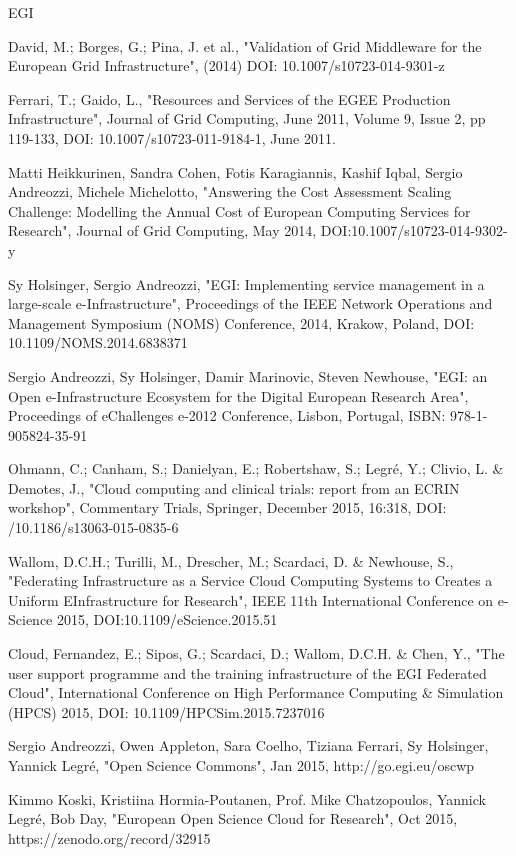 \begin{sitedescription}{EGI}
\begin{compactenum}
\item David, M.; Borges, G.; Pina, J. et al., "Validation of Grid Middleware for the European Grid Infrastructure", (2014) DOI: 10.1007/s10723-014-9301-z 
\item Ferrari, T.; Gaido, L., "Resources and Services of the EGEE Production Infrastructure", Journal of Grid Computing, June 2011, Volume 9, Issue 2, pp 119-133, DOI: 10.1007/s10723-011-9184-1, June 2011. 
\item Matti Heikkurinen, Sandra Cohen, Fotis Karagiannis, Kashif Iqbal, Sergio Andreozzi, Michele Michelotto, "Answering the Cost Assessment Scaling Challenge: Modelling the Annual Cost of European Computing Services for Research", Journal of Grid Computing, May 2014, DOI:10.1007/s10723-014-9302-y 
\item Sy Holsinger, Sergio Andreozzi, "EGI: Implementing service management in a large-scale e-Infrastructure", Proceedings of the IEEE Network Operations and Management Symposium (NOMS) Conference, 2014, Krakow, Poland, DOI: 10.1109/NOMS.2014.6838371
\item Sergio Andreozzi, Sy Holsinger, Damir Marinovic, Steven Newhouse, "EGI: an Open e-Infrastructure Ecosystem for the Digital European Research Area", Proceedings of eChallenges e-2012 Conference, Lisbon, Portugal, ISBN: 978-1-905824-35-91 
\item Ohmann, C.; Canham, S.; Danielyan, E.; Robertshaw, S.; Legr\'e, Y.; Clivio, L. \& Demotes, J., "Cloud computing and clinical trials: report from an ECRIN workshop", Commentary Trials, Springer, December 2015, 16:318, DOI: /10.1186/s13063-015-0835-6 \newline
\item Wallom, D.C.H.; Turilli, M., Drescher, M.; Scardaci, D. \& Newhouse, S., "Federating Infrastructure as a Service Cloud Computing Systems to Creates a Uniform EInfrastructure for Research", IEEE 11th International Conference on e-Science 2015, DOI:10.1109/eScience.2015.51
\item Cloud, Fernandez, E.; Sipos, G.; Scardaci, D.; Wallom, D.C.H. \& Chen, Y., "The user support programme and the training infrastructure of the EGI Federated Cloud", International Conference on High Performance Computing \& Simulation (HPCS) 2015, DOI: 10.1109/HPCSim.2015.7237016 
\item Sergio Andreozzi, Owen Appleton, Sara Coelho, Tiziana Ferrari, Sy Holsinger, Yannick Legr\'e, "Open Science Commons", Jan 2015, http://go.egi.eu/oscwp
\item Kimmo Koski, Kristiina Hormia-Poutanen, Prof. Mike Chatzopoulos, Yannick Legré, Bob Day, "European Open Science Cloud for Research", Oct 2015, https://zenodo.org/record/32915
\end{compactenum}


\end{sitedescription}
